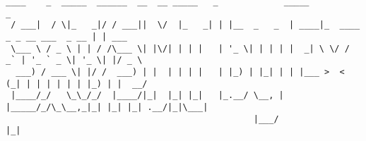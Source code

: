 \begin{center}
\vspace*{\fill}

\begin{lstlisting}[basicstyle=\small,frame=none]
  ____    _  _____  ______  __  __ _____   _             _____                           _      
 / ___|  / \|_   _|/ / ___||  \/  |_   _| | |__  _   _  | ____|_  ____ _ _ __ ___  _ __ | | ___ 
 \___ \ / _ \ | | / /\___ \| |\/| | | |   | '_ \| | | | |  _| \ \/ / _` | '_ ` _ \| '_ \| |/ _ \
  ___) / ___ \| |/ /  ___) | |  | | | |   | |_) | |_| | | |___ >  < (_| | | | | | | |_) | |  __/
 |____/_/   \_\_/_/  |____/|_|  |_| |_|   |_.__/ \__, | |_____/_/\_\__,_|_| |_| |_| .__/|_|\___|
                                                 |___/                            |_|           
\end{lstlisting}

\vspace*{\fill}
\end{center}
